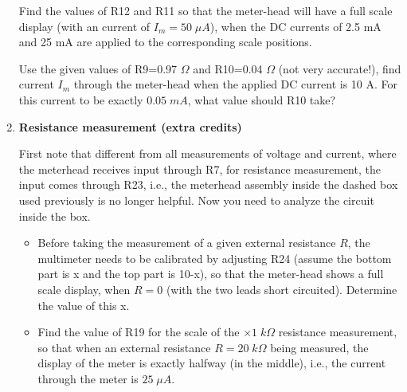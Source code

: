\begin{enumerate}
  Find the values of R12 and R11 so that the meter-head will have a full
  scale display (with an current of $I_m=50\;\mu A$), when the DC currents 
  of 2.5 mA and 25 mA are applied to the corresponding scale positions.  

  Use the given values of R9=0.97 $\Omega$ and R10=0.04 $\Omega$ (not very
  accurate!), find current $I_m$ through the meter-head when the applied DC 
  current is 10 A. For this current to be exactly $0.05\;mA$, what value 
  should R10 take?
  
  \begin{comment}
  {\bf Solution:}

  The circuit for each scale of the DC current measurement is a current divider
  with an internal resistance for the meter-head:

  \begin{itemize}
  \item 2.5 mA
    \[
    I_m=2.5\;\frac{R12}{R12+5000}=0.05,\;\;\;\;\;\;\;R12=102
    \]
  \item 25 mA
    \[
    I_m=25\;\frac{R11}{R11+5000}=0.05,\;\;\;\;\;\;\;R11=10
    \]
  \item 250 mA
    \[
    I_m=250\;\frac{R9+R10}{R9+R10+5000}=0.05,\;\;\;\;\;\;\;\;\;R9+R10=1
    \]
  \end{itemize}
  \[
  I_m=10000\;\frac{R10}{5000+0.97+R10}=0.05\;mA,\;\;\;\;\;
  R10=0.025\;\Omega
  \]
  \end{comment}

\item {\bf Resistance measurement (extra credits)}

  First note that different from all measurements of voltage and current,
  where the meterhead receives input through R7, for resistance measurement,
  the input comes through R23, i.e., the meterhead assembly inside the dashed
  box used previously is no longer helpful. Now you need to analyze the
  circuit inside the box.  

  \begin{itemize}
  \item Before taking the measurement of a given external resistance $R$, 
    the multimeter needs to be calibrated by adjusting R24 (assume the bottom 
    part is x and the top part is 10-x), so that the meter-head shows a full 
    scale display, when $R=0$ (with the two leads short circuited). Determine 
    the value of this x. 

  \item Find the value of R19 for the scale of the $\times 1\;k\Omega$
    resistance measurement, so that when an external resistance $R=20\;k\Omega$
    being measured, the display of the meter is exactly halfway (in the middle),
    i.e., the current through the meter is $25\;\mu A$.


\end{itemize}
\end{enumerate}
